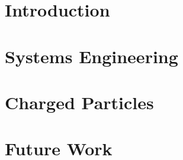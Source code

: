 \chapter{Introduction}



\chapter{Systems Engineering}
\label{chap:systems}




\chapter{Charged Particles}


\chapter{Future Work}
